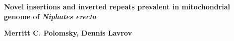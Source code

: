\documentclass[../main.tex]{subfiles}
\begin{document}
\begin{titlepage}
   \begin{center}
       \vspace*{1cm}
        \huge
       \textbf{Novel insertions and inverted repeats prevalent in mitochondrial genome of \emph{Niphates erecta}}
       \vspace{2.0cm}
       
       \large
       \textbf{Merritt C. Polomsky, Dennis Lavrov}
       \vfill
       \vspace{0.8cm}
   \end{center}
\end{titlepage}
\end{document}
